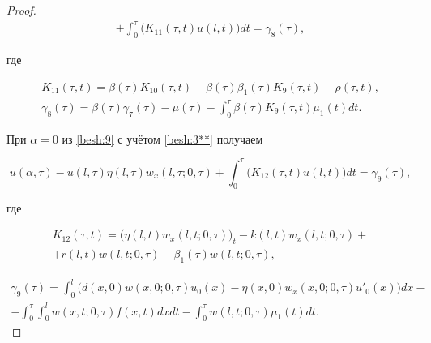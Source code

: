 \begin{proof}
\begin{multline}
+ \int^{\tau}_0\Big(K_{11}(\tau,t)u(l,t)\Big)dt=\gamma_{8}(\tau),

\label{besh:20}

\end{multline}

где

\begin{gather*}

K_{11}(\tau,t)=\beta(\tau)K_{10}(\tau,t)-\beta(\tau)\beta_{1}(\tau)K_{9}(\tau,t)-\rho(\tau,t),

\\

\gamma_{8}(\tau)=\beta(\tau)\gamma_{7}(\tau)-\mu(\tau)-

\int^{\tau}_{0}\beta(\tau)K_{9}(\tau,t)\mu_{1}(t)dt.

\end{gather*}



При $\alpha=0$ из \eqref{besh:9} с учётом \eqref{besh:3**} получаем

\begin{equation}

u(\alpha,\tau) - u(l,\tau)\eta(l,\tau)w_{x}(l,\tau;0,\tau)

+\int^{\tau}_0\Big(K_{12}(\tau,t)u(l,t)\Big)dt=\gamma_{9}(\tau),

\label{besh:21}

\end{equation}

где

\begin{multline*}

K_{12}(\tau,t)=\big(\eta(l,t)w_{x}(l,t;0,\tau)\big)_{t}-

k(l,t)w_{x}(l,t;0,\tau)+

\\

+r(l,t)w(l,t;0,\tau)-\beta_{1}(\tau)w(l,t;0,\tau),

\end{multline*} 

\begin{multline*}

\gamma_{9}(\tau)=\int^{l}_0\Big(d(x, 0)w(x, 0;0,\tau)u_{0}(x)-\eta(x, 0)w_{x}(x, 0;0,\tau)u'_{0}(x)

\Big)dx-

\\

-\int^{\tau}_0 \int^l_{0}w(x,t;0,\tau)f(x,t)dxdt -

\int^{\tau}_{0}w(l,t;0,\tau)\mu_{1}(t)dt.


\end{multline*}
\end{proof}
